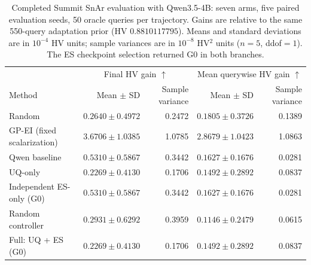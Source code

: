 \begin{table}[t]
\centering
\small
\caption{Completed Summit SnAr evaluation with Qwen3.5-4B: seven arms, five paired evaluation seeds, 50 oracle queries per trajectory. Gains are relative to the same 550-query adaptation prior (HV $0.8810117795$). Means and standard deviations are in $10^{-4}$ HV units; sample variances are in $10^{-8}$ HV$^2$ units ($n=5$, ddof$=1$). The ES checkpoint selection returned G0 in both branches.}
\label{tab:snar-main}
\begin{tabular}{lrrrr}
\toprule
& \multicolumn{2}{c}{Final HV gain $\uparrow$} & \multicolumn{2}{c}{Mean querywise HV gain $\uparrow$} \\
Method & Mean $\pm$ SD & Sample variance & Mean $\pm$ SD & Sample variance \\
\midrule
Random & $0.2640 \pm 0.4972$ & 0.2472 & $0.1805 \pm 0.3726$ & 0.1389 \\
GP-EI (fixed scalarization) & $3.6706 \pm 1.0385$ & 1.0785 & $2.8679 \pm 1.0423$ & 1.0863 \\
Qwen baseline & $0.5310 \pm 0.5867$ & 0.3442 & $0.1627 \pm 0.1676$ & 0.0281 \\
UQ-only & $0.2269 \pm 0.4130$ & 0.1706 & $0.1492 \pm 0.2892$ & 0.0837 \\
Independent ES-only (G0) & $0.5310 \pm 0.5867$ & 0.3442 & $0.1627 \pm 0.1676$ & 0.0281 \\
Random controller & $0.2931 \pm 0.6292$ & 0.3959 & $0.1146 \pm 0.2479$ & 0.0615 \\
Full: UQ + ES (G0) & $0.2269 \pm 0.4130$ & 0.1706 & $0.1492 \pm 0.2892$ & 0.0837 \\
\bottomrule
\end{tabular}
\end{table}
